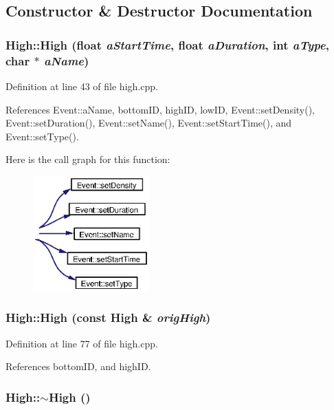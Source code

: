 \subsection{Constructor \& Destructor Documentation}
\subsubsection{\setlength{\rightskip}{0pt plus 5cm}High::High (float {\em a\-Start\-Time}, float {\em a\-Duration}, int {\em a\-Type}, char $\ast$ {\em a\-Name})}\label{classHigh_a0}




Definition at line 43 of file high.cpp.

References Event::a\-Name, bottom\-ID, high\-ID, low\-ID, Event::set\-Density(), Event::set\-Duration(), Event::set\-Name(), Event::set\-Start\-Time(), and Event::set\-Type().

Here is the call graph for this function:\begin{figure}[H]
\begin{center}
\leavevmode
\includegraphics[width=127pt]{classHigh_a0_cgraph}
\end{center}
\end{figure}
\subsubsection{\setlength{\rightskip}{0pt plus 5cm}High::High (const {\bf High} \& {\em orig\-High})}\label{classHigh_a1}




Definition at line 77 of file high.cpp.

References bottom\-ID, and high\-ID.
\subsubsection{\setlength{\rightskip}{0pt plus 5cm}High::$\sim${\bf High} ()}\label{classHigh_a2}





